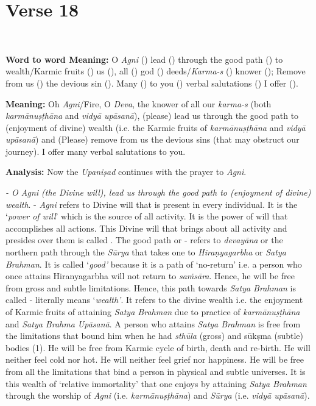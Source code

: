 \chapter{Verse 18}

\begin{moolashloka}
\\
\end{moolashloka}

\textbf{Word to word Meaning:} O \emph{Agni} () lead () through the good path () to wealth/Karmic fruits () us (), all () god () deeds/\emph{Karma-s} () knower (); Remove from us () the devious sin (). Many () to you () verbal salutations () I offer ().

\textbf{Meaning:} Oh \emph{Agni}/Fire, O \emph{Deva}, the knower of all our \emph{karma-s} (both \emph{karmānuṣṭhāna} and \emph{vidyā upāsanā}), (please) lead us through the good path to (enjoyment of divine) wealth (i.e. the Karmic fruits of \emph{karmānuṣṭhāna} and \emph{vidyā upāsanā}) and (Please) remove from us the devious sins (that may obstruct our journey). I offer many verbal salutations to you.

\textbf{Analysis:} Now the \emph{Upaniṣad} continues with the prayer to \emph{Agni}.

\emph{- O Agni (the Divine will), lead us through the good path to (enjoyment of divine) wealth}.  - \emph{Agni} refers to Divine will that is present in every individual. It is the `\emph{power of will}' which is the source of all activity. It is the power of will that accomplishes all actions. This Divine will that brings about all activity and presides over them is called . The good path or - refers to \emph{devayāna} or the northern path through the \emph{Sūrya} that takes one to \emph{Hiraṇyagarbha} or \emph{Satya Brahman}. It is called `\emph{good'} because it is a path of `no-return' i.e. a person who once attains Hiranyagarbha will not return to \emph{saṁsāra}. Hence, he will be free from gross and subtle limitations. Hence, this path towards \emph{Satya Brahman} is called - literally means `\emph{wealth'}. It refers to the divine wealth i.e. the enjoyment of Karmic fruits of attaining \emph{Satya Brahman} due to practice of \emph{karmānuṣṭhāna} and \emph{Satya Brahma Upāsanā}. A person who attains \emph{Satya Brahman} is free from the limitations that bound him when he had \emph{sthūla} (gross) and sūkṣma (subtle) bodies (1). He will be free from Karmic cycle of birth, death and re-birth. He will neither feel cold nor hot. He will neither feel grief nor happiness. He will be free from all the limitations that bind a person in physical and subtle universes. It is this wealth of `relative immortality' that one enjoys by attaining \emph{Satya Brahman} through the worship of \emph{Agni} (i.e. \emph{karmānuṣṭhāna}) and \emph{Sūrya} (i.e. \emph{vidyā upāsanā}).

